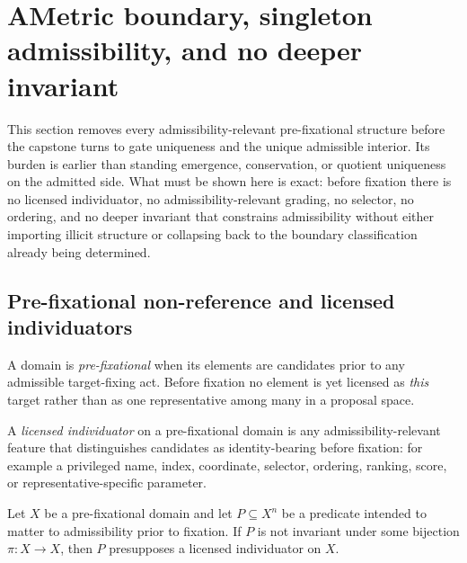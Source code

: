 \section{AMetric boundary, singleton admissibility, and no deeper invariant}
\label{sec:ametric-boundary}

This section removes every admissibility-relevant pre-fixational structure before the capstone turns to gate uniqueness and the unique admissible interior. Its burden is earlier than standing emergence, conservation, or quotient uniqueness on the admitted side. What must be shown here is exact: before fixation there is no licensed individuator, no admissibility-relevant grading, no selector, no ordering, and no deeper invariant that constrains admissibility without either importing illicit structure or collapsing back to the boundary classification already being determined.

\subsection{Pre-fixational non-reference and licensed individuators}

\begin{definition}
A domain is \emph{pre-fixational} when its elements are candidates prior to any admissible target-fixing act. Before fixation no element is yet licensed as \emph{this} target rather than as one representative among many in a proposal space.
\end{definition}

\begin{definition}
A \emph{licensed individuator} on a pre-fixational domain is any admissibility-relevant feature that distinguishes candidates as identity-bearing before fixation: for example a privileged name, index, coordinate, selector, ordering, ranking, score, or representative-specific parameter.
\end{definition}

\begin{lemma}
Let $X$ be a pre-fixational domain and let $P\subseteq X^n$ be a predicate intended to matter to admissibility prior to fixation. If $P$ is not invariant under some bijection $\pi:X\to X$, then $P$ presupposes a licensed individuator on $X$.
\end{lemma}

